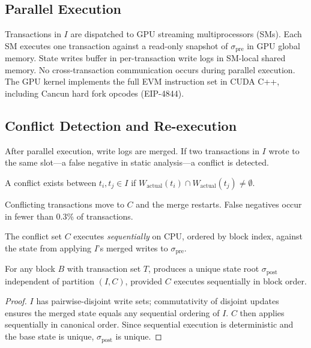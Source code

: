 \subsection{Parallel Execution}

Transactions in $I$ are dispatched to GPU streaming multiprocessors (SMs).
Each SM executes one transaction against a read-only snapshot of $\sigma_{\text{pre}}$ in GPU global memory.
State writes buffer in per-transaction write logs in SM-local shared memory.
No cross-transaction communication occurs during parallel execution.
The GPU kernel implements the full EVM instruction set in CUDA C++, including Cancun hard fork opcodes (EIP-4844).

\subsection{Conflict Detection and Re-execution}

After parallel execution, write logs are merged.
If two transactions in $I$ wrote to the same slot---a false negative in static analysis---a conflict is detected.

\begin{definition}
A conflict exists between $t_i, t_j \in I$ if $W_{\text{actual}}(t_i) \cap W_{\text{actual}}(t_j) \neq \emptyset$.
\end{definition}

Conflicting transactions move to $C$ and the merge restarts.
False negatives occur in fewer than 0.3\% of transactions.

The conflict set $C$ executes \emph{sequentially} on CPU, ordered by block index, against the state from applying $I$'s merged writes to $\sigma_{\text{pre}}$.

\begin{theorem}
\label{thm:deterministic}
For any block $B$ with transaction set $T$, \cevm{} produces a unique state root $\sigma_{\text{post}}$ independent of partition $(I, C)$, provided $C$ executes sequentially in block order.
\end{theorem}

\begin{proof}
$I$ has pairwise-disjoint write sets; commutativity of disjoint updates ensures the merged state equals any sequential ordering of $I$.
$C$ then applies sequentially in canonical order.
Since sequential execution is deterministic and the base state is unique, $\sigma_{\text{post}}$ is unique.
\end{proof}


